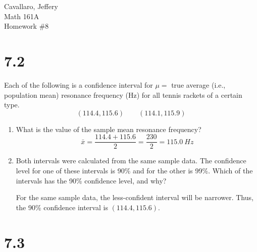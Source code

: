 \documentclass[letterpaper,12pt,fleqn]{article}
\newcommand{\m}{\mu}
\begin{document}
Cavallaro, Jeffery \\
Math 161A \\
Homework \#8

\bigskip

\section*{7.2}

Each of the following is a confidence interval for \(\m=\) true average (i.e., population mean) resonance frequency (Hz) for
all tennis rackets of a certain type.
\[(114.4, 115.6)\qquad(114.1,115.9)\]
\begin{enumerate}[label={\alph*)}]
\item What is the value of the sample mean resonance frequency?
  \[\bar{x}=\frac{114.4+115.6}{2}=\frac{230}{2}=\SI{115.0}{Hz}\]
\item Both intervals were calculated from the same sample data.  The confidence level for one of these intervals is 90\% and
  for the other is 99\%.  Which of the intervals has the 90\% confidence level, and why?

  For the same sample data, the less-confident interval will be narrower.  Thus, the 90\% confidence interval is
  \((114.4, 115.6)\).
\end{enumerate}

\section*{7.3}
\end{document}

